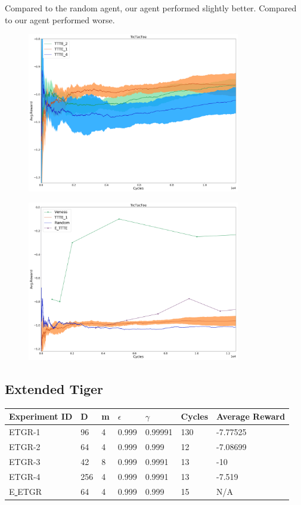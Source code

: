 \documentclass{article}
\theoremstyle{definition}
\newtheorem{primary statistics}[definition]{Primary Statistics}
\newtheorem{auxiliary statistics}[definition]{Auxiliary Statistics}
\begin{document}
Compared to the random agent, our agent performed slightly better. Compared to \citep{veness2011monte} our agent performed worse.

 \begin{figure}[h]
 \centering
    \includegraphics[width=9.3cm]{4_TicTacToe}
\end{figure}

 \begin{figure}[h]
 \centering
    \includegraphics[width=9.3cm]{TicTacToe}
\end{figure}

\newpage

\subsection{Extended Tiger}
 \begin{tabular}{|l|l|l|l|l|l|l|}
 \hline \centering
 Experiment ID& D & m & $\epsilon$ & $\gamma$ & Cycles & Average Reward \\ \hline
ETGR-1 & 96        & 4           & 0.999       & 0.99991           & 130    & -7.77525        \\ \hline
ETGR-2 & 64        & 4           & 0.999       & 0.999             & 12     & -7.08699       \\ \hline
ETGR-3 & 42        & 8           & 0.999       & 0.9991            & 13     & -10             \\ \hline
ETGR-4 & 256       & 4           & 0.999       & 0.9991            & 13     & -7.519  \\ \hline 
E\underline{ }ETGR & 64       & 4           & 0.999       & 0.999            & 15     & N/A  \\ \hline    
\end{tabular}
\end{document}

